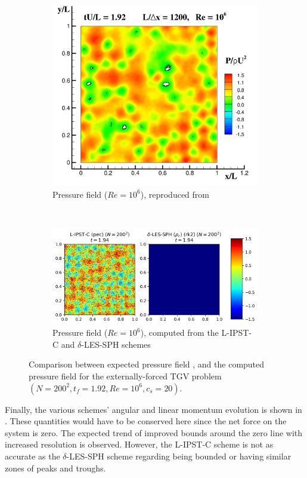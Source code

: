 \begin{figure}[htbp!]
\centering
\begin{subfigure}{10cm}
\centering\includegraphics[width=10cm]{Code-Figures/ext-force-tgv/colag_p_t_1.92.png}
\caption{Pressure field ($Re = 10^6$), reproduced from \cite{Colagrossi2021QuasiLagrangian}}
\end{subfigure}
\\ \vspace{1cm}
\begin{subfigure}{14cm}
\centering\includegraphics[width=14cm]{Code-Figures/ext-force-tgv/p_t_1.92.png}
\caption{Pressure field ($Re = 10^6$), computed from the L-IPST-C and $\delta$-LES-SPH schemes}
\end{subfigure}
\caption{Comparison between expected pressure field \parencite{Colagrossi2021QuasiLagrangian}, and the computed pressure field for the externally-forced TGV problem $(N=200^2, t_f=1.92, Re=10^6, c_s=20)$.}
\label{fig:tgv-forced-colag-p}
\end{figure}


Finally, the various schemes' angular and linear momentum evolution is shown in . These quantities would have to be conserved here since the net force on the system is zero. The expected trend of improved bounds around the zero line with increased resolution is observed.
However, the L-IPST-C scheme is not as accurate as the $\delta$-LES-SPH scheme regarding being bounded or having similar zones of peaks and troughs.

